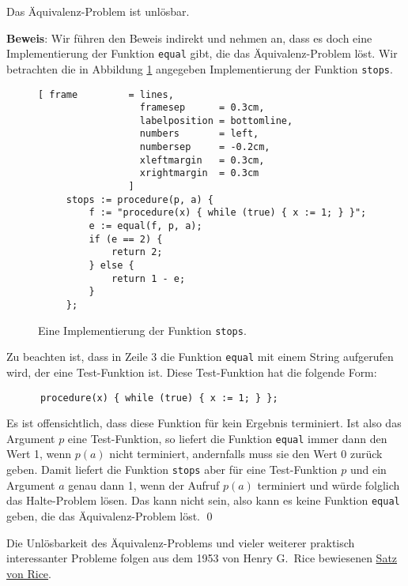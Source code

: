 \begin{Theorem}[Rice, 1953]
Das Äquivalenz-Problem ist unlösbar.  
\end{Theorem}

\noindent
\textbf{Beweis}:
Wir führen den Beweis indirekt und nehmen
an, dass es doch eine Implementierung der Funktion \texttt{equal} gibt, die das
Äquivalenz-Problem löst.  Wir betrachten die in Abbildung 
\ref{fig:stops} angegeben Implementierung der Funktion \texttt{stops}.


\begin{figure}[!h]
  \centering
\begin{Verbatim}[ frame         = lines, 
                  framesep      = 0.3cm, 
                  labelposition = bottomline,
                  numbers       = left,
                  numbersep     = -0.2cm,
                  xleftmargin   = 0.3cm,
                  xrightmargin  = 0.3cm
                ]
     stops := procedure(p, a) {
         f := "procedure(x) { while (true) { x := 1; } }"; 
         e := equal(f, p, a);
         if (e == 2) {
             return 2;
         } else {
             return 1 - e;
         }
     };
\end{Verbatim}
  \vspace*{-0.3cm}
  \caption{Eine Implementierung der Funktion \texttt{stops}.}
  \label{fig:stops}
\end{figure}

Zu beachten ist, dass in Zeile 3 die Funktion \texttt{equal} mit einem String aufgerufen
wird, der eine Test-Funktion ist.  Diese 
Test-Funktion hat die
folgende Form:
\begin{verbatim}
      procedure(x) { while (true) { x := 1; } };
\end{verbatim}
Es ist offensichtlich, dass diese Funktion für kein Ergebnis terminiert.
Ist also das Argument $p$ eine Test-Funktion, so liefert die Funktion
\texttt{equal} immer dann den Wert 1, 
wenn $p(a)$ nicht terminiert, andernfalls muss sie den Wert 0 zurück geben.
Damit liefert die Funktion \texttt{stops} aber für eine Test-Funktion $p$ 
und ein Argument 
$a$ genau dann 1, wenn der Aufruf $p(a)$ terminiert und würde folglich das Halte-Problem
lösen.  Das kann nicht sein, also kann es keine Funktion  \texttt{equal}
geben, die das Äquivalenz-Problem löst. 
\qed
\vspace*{0.3cm}

\noindent
Die Unlösbarkeit des Äquivalenz-Problems und vieler weiterer praktisch interessanter
Probleme folgen aus dem 1953 von Henry G.~Rice \cite{rice:53} bewiesenen
\href{http://de.wikipedia.org/wiki/Satz_von_Rice}{Satz von Rice}.

